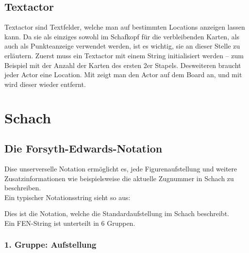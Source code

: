 \subsection{Textactor}

Textactor sind Textfelder, welche man auf bestimmten Locations anzeigen lassen
kann. Da sie als einziges sowohl im Schafkopf für die verbleibenden Karten, als
auch als Punkteanzeige verwendet werden, ist es wichtig, sie an dieser Stelle
zu erläutern. Zuerst muss ein Textactor mit einem String initialisiert werden
-- zum Beispiel mit der Anzahl der Karten des ersten 2er Stapels. Desweiteren
braucht jeder Actor eine Location. Mit 
zeigt man den Actor auf dem Board an, und mit 
wird dieser wieder entfernt.

\section{Schach}

\subsection{Die Forsyth-Edwards-Notation}
\subsectionauthor{\frank}

Dise unserverselle Notation ermöglicht es, jede Figurenaufstellung und weitere
Zusatzinformationen wie beispielsweise die aktuelle Zugnummer in Schach zu
beschreiben.\\ Ein typischer Notationsstring sieht so aus:


Dies ist die Notation, welche die Standardaufstellung im Schach beschreibt.\\
Ein FEN-String ist unterteilt in 6 Gruppen.

\subsubsection{1. Gruppe: Aufstellung}


